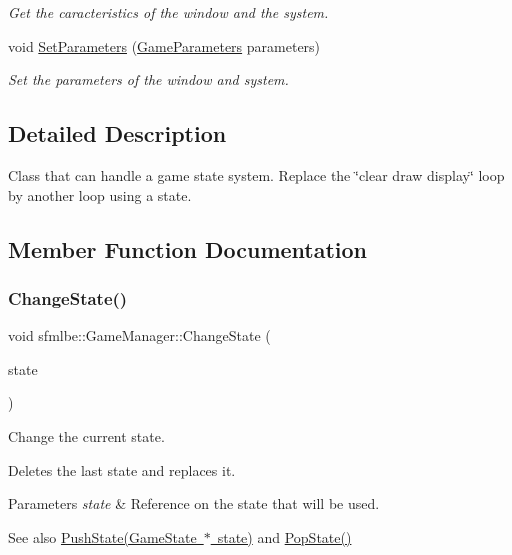 \begin{DoxyCompactItemize}
\begin{DoxyCompactList}\small\item\em Get the caracteristics of the window and the system. \end{DoxyCompactList}\item 
void \mbox{\hyperlink{classsfmlbe_1_1_game_manager_aaea9fd274be0e81c1e493e9a89edc7eb}{Set\+Parameters}} (\mbox{\hyperlink{structsfmlbe_1_1_game_parameters}{Game\+Parameters}} parameters)
\begin{DoxyCompactList}\small\item\em Set the parameters of the window and system. \end{DoxyCompactList}\end{DoxyCompactItemize}


\subsection{Detailed Description}
Class that can handle a game state system. Replace the \char`\"{}clear draw display\char`\"{} loop by another loop using a state. 

\subsection{Member Function Documentation}
\mbox{\label{classsfmlbe_1_1_game_manager_a7bb485f2b11da154da6b3a2d1fa0860f}} 
\subsubsection{\texorpdfstring{Change\+State()}{ChangeState()}}
{\footnotesize\ttfamily void sfmlbe\+::\+Game\+Manager\+::\+Change\+State (\begin{DoxyParamCaption}\item[{\mbox{\hyperlink{classsfmlbe_1_1_game_state}{Game\+State}} $\ast$}]{state }\end{DoxyParamCaption})}



Change the current state. 

Deletes the last state and replaces it. 
\begin{DoxyParams}{Parameters}
{\em state} & Reference on the state that will be used. \\
\hline
\end{DoxyParams}
\begin{DoxySeeAlso}{See also}
\mbox{\hyperlink{classsfmlbe_1_1_game_manager_a63e4a2e13a8ce27e1c394fa942212dc1}{Push\+State(\+Game\+State $\ast$ state)}} and \mbox{\hyperlink{classsfmlbe_1_1_game_manager_a2c80186d2de5b168900bb91b05eb11ee}{Pop\+State()}} 
\end{DoxySeeAlso}
\mbox{\label{classsfmlbe_1_1_game_manager_a718bd72362c1ba9504ca0852b2073f1b}} 
